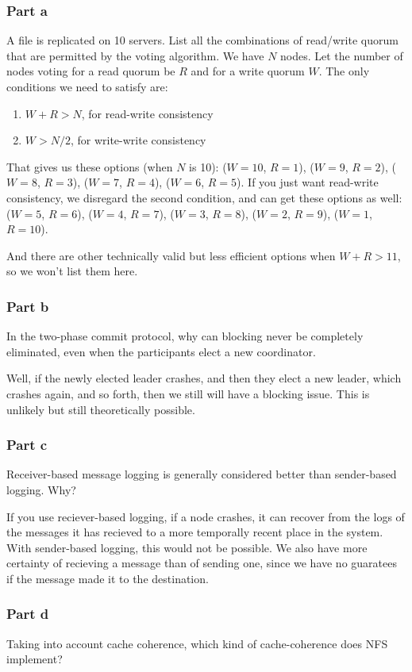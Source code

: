 \documentclass[english]{article}
\begin{document}
\subsubsection*{Part a}
A file is replicated on 10 servers. List all the combinations of read/write quorum that are permitted by the voting algorithm.
We have $N$ nodes. Let the number of nodes voting for a read quorum be $R$ and for a write quorum $W$. The only conditions we need to satisfy are:
\begin{enumerate}
\item $W + R > N$, for read-write consistency
\item $W > N/2$, for write-write consistency
\end{enumerate}
That gives us these options (when $N$ is 10):
($W=10$, $R=1$), ($W=9$, $R=2$), ($W=8$, $R=3$), ($W=7$, $R=4$), ($W=6$, $R=5$).
If you just want read-write consistency, we disregard the second condition, and can get these options as well:
($W=5$, $R=6$), ($W=4$, $R=7$), ($W=3$, $R=8$), ($W=2$, $R=9$), ($W=1$, $R=10$).

And there are other technically valid but less efficient options when $W + R > 11$, so we won't list them here.

\subsubsection*{Part b}
In the two-phase commit protocol, why can blocking never be completely eliminated, even when the participants elect a
new coordinator.

Well, if the newly elected leader crashes, and then they elect a new leader, which crashes again, and so forth,
then we still will have a blocking issue. This is unlikely but still theoretically possible.

\subsubsection*{Part c}
Receiver-based message logging is generally considered better than sender-based logging. Why?

If you use reciever-based logging, if a node crashes, it can recover from the logs of the messages it has recieved
to a more temporally recent place in the system. With sender-based logging, this would not be possible. We also have
more certainty of recieving a message than of sending one, since we have no guaratees if the message made it to the
destination.

\subsubsection*{Part d}
Taking into account cache coherence, which kind of cache-coherence does NFS implement?
\end{document}
